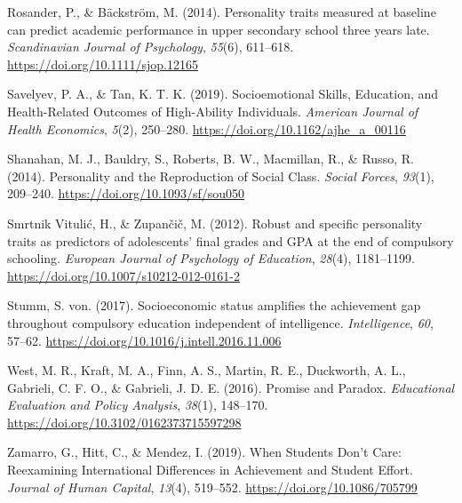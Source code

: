 \documentclass[
  12pt,
  a4paper,
]{article}
\newlength{\cslhangindent}
\newlength{\cslentryspacingunit} %
\newenvironment{CSLReferences}[2] %
 {%
  \setlength{\parindent}{0pt}
  \ifodd #1
  \let\oldpar\par
  \def\par{\hangindent=\cslhangindent\oldpar}
  \fi
  \setlength{\parskip}{#2\cslentryspacingunit}
 }%
 {}
\begin{document}
\begin{CSLReferences}{1}{0}
\leavevmode{}%
Rosander, P., \& Bäckström, M. (2014). Personality traits measured at
baseline can predict academic performance in upper secondary school
three years late. \emph{Scandinavian Journal of Psychology},
\emph{55}(6), 611--618. \url{https://doi.org/10.1111/sjop.12165}

\leavevmode{}%
Savelyev, P. A., \& Tan, K. T. K. (2019). Socioemotional Skills,
Education, and Health-Related Outcomes of High-Ability Individuals.
\emph{American Journal of Health Economics}, \emph{5}(2), 250--280.
\url{https://doi.org/10.1162/ajhe_a_00116}

\leavevmode{}%
Shanahan, M. J., Bauldry, S., Roberts, B. W., Macmillan, R., \& Russo,
R. (2014). Personality and the Reproduction of Social Class.
\emph{Social Forces}, \emph{93}(1), 209--240.
\url{https://doi.org/10.1093/sf/sou050}

\leavevmode{}%
Smrtnik Vitulić, H., \& Zupančič, M. (2012). Robust and specific
personality traits as predictors of adolescents{'} final grades and GPA
at the end of compulsory schooling. \emph{European Journal of Psychology
of Education}, \emph{28}(4), 1181--1199.
\url{https://doi.org/10.1007/s10212-012-0161-2}

\leavevmode{}%
Stumm, S. von. (2017). Socioeconomic status amplifies the achievement
gap throughout compulsory education independent of intelligence.
\emph{Intelligence}, \emph{60}, 57--62.
\url{https://doi.org/10.1016/j.intell.2016.11.006}

\leavevmode{}%
West, M. R., Kraft, M. A., Finn, A. S., Martin, R. E., Duckworth, A. L.,
Gabrieli, C. F. O., \& Gabrieli, J. D. E. (2016). Promise and Paradox.
\emph{Educational Evaluation and Policy Analysis}, \emph{38}(1),
148--170. \url{https://doi.org/10.3102/0162373715597298}

\leavevmode{}%
Zamarro, G., Hitt, C., \& Mendez, I. (2019). When Students Don{'}t Care:
Reexamining International Differences in Achievement and Student Effort.
\emph{Journal of Human Capital}, \emph{13}(4), 519--552.
\url{https://doi.org/10.1086/705799}

\end{CSLReferences}
\end{document}
